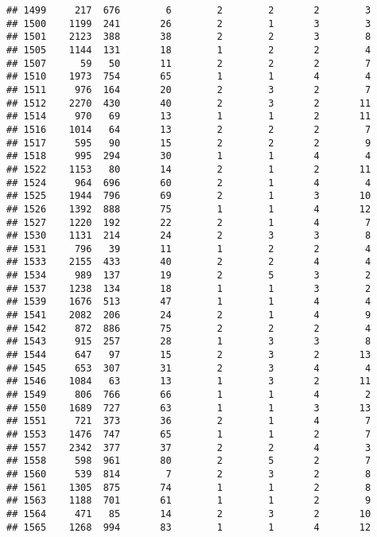\documentclass[]{article}
\begin{document}
\begin{verbatim}
## 1499     217  676        6        2        2       2        3
## 1500    1199  241       26        2        1       3        3
## 1501    2123  388       38        2        2       3        8
## 1505    1144  131       18        1        2       2        4
## 1507      59   50       11        2        2       2        7
## 1510    1973  754       65        1        1       4        4
## 1511     976  164       20        2        3       2        7
## 1512    2270  430       40        2        3       2       11
## 1514     970   69       13        1        1       2       11
## 1516    1014   64       13        2        2       2        7
## 1517     595   90       15        2        2       2        9
## 1518     995  294       30        1        1       4        4
## 1522    1153   80       14        2        1       2       11
## 1524     964  696       60        2        1       4        4
## 1525    1944  796       69        2        1       3       10
## 1526    1392  888       75        1        1       4       12
## 1527    1220  192       22        2        1       4        7
## 1530    1131  214       24        2        3       3        8
## 1531     796   39       11        1        2       2        4
## 1533    2155  433       40        2        2       4        4
## 1534     989  137       19        2        5       3        2
## 1537    1238  134       18        1        1       3        2
## 1539    1676  513       47        1        1       4        4
## 1541    2082  206       24        2        1       4        9
## 1542     872  886       75        2        2       2        4
## 1543     915  257       28        1        3       3        8
## 1544     647   97       15        2        3       2       13
## 1545     653  307       31        2        3       4        4
## 1546    1084   63       13        1        3       2       11
## 1549     806  766       66        1        1       4        2
## 1550    1689  727       63        1        1       3       13
## 1551     721  373       36        2        1       4        7
## 1553    1476  747       65        1        1       2        7
## 1557    2342  377       37        2        2       4        3
## 1558     598  961       80        2        5       2        7
## 1560     539  814        7        2        3       2        8
## 1561    1305  875       74        1        1       2        8
## 1563    1188  701       61        1        1       2        9
## 1564     471   85       14        2        3       2       10
## 1565    1268  994       83        1        1       4       12

\end{verbatim}
\end{document}
